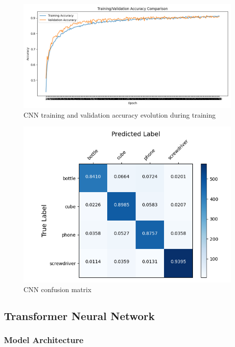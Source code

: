 \begin{figure}[h]
\centerline{\includegraphics[width=14cm]{figs/acc_comparison.png}}
\caption[CNN training and validation accuracy evolution during training]{CNN training and validation accuracy evolution during training}
\label{fig:cnn_acc}
\end{figure}

\begin{figure}[h]
\centerline{\includegraphics[width=12cm]{figs/conf_matrix.png}}
\caption[CNN confusion matrix]{CNN confusion matrix}
\label{fig:cnn_confusion_matrix}
\end{figure}

\subsection{Transformer Neural Network}

\subsubsection{Model Architecture}

